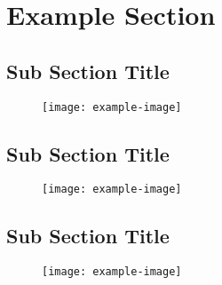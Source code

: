 \section{Example Section}
\subsection{Sub Section Title}

\lipsum[2-3]

\begin{figure}[ht]
    \centering
    \texttt{[image: example-image]}
    \caption{}
\end{figure}
\break
\newpage

\subsection{Sub Section Title}
\lipsum[3-4]

\begin{figure}[ht]
    \centering
    \texttt{[image: example-image]}
    \caption{}
\end{figure}

\subsection{Sub Section Title}

\lipsum[4-5]

\begin{figure}[ht]
    \centering
    \texttt{[image: example-image]}
    \caption{}
\end{figure}

\cleardoublepage
